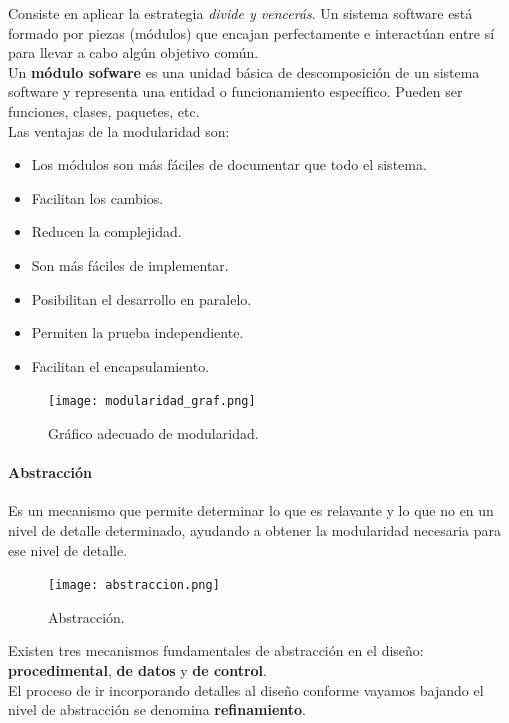 \documentclass[12pt,spanish]{article}
\begin{document}
Consiste en aplicar la estrategia \emph{divide y vencerás}. Un sistema software está formado por piezas (módulos) que encajan perfectamente e interactúan entre sí para llevar a cabo algún objetivo común.\\

Un \textbf{módulo sofware} es una unidad básica de descomposición de un sistema software y representa una entidad o funcionamiento específico. Pueden ser funciones, clases, paquetes, etc.\\

Las ventajas de la modularidad son:

\begin{itemize}
	\item Los módulos son más fáciles de documentar que todo el sistema.
	\item Facilitan los cambios.
	\item Reducen la complejidad.
	\item Son más fáciles de implementar.
	\item Posibilitan el desarrollo en paralelo.
	\item Permiten la prueba independiente.
	\item Facilitan el encapsulamiento.
\end{itemize}

\begin{figure}[H]
\centering
\texttt{[image: modularidad\_graf.png]}
\caption{Gráfico adecuado de modularidad.}
\end{figure}

\paragraph{Abstracción\\}

Es un mecanismo que permite determinar lo que es relavante y lo que no en un nivel de detalle determinado, ayudando a obtener la modularidad necesaria para ese nivel de detalle.

\begin{figure}[H]
\centering
\texttt{[image: abstraccion.png]}
\caption{Abstracción.}
\end{figure}

Existen tres mecanismos fundamentales de abstracción en el diseño: \textbf{procedimental}, \textbf{de datos} y \textbf{de control}. \\

El proceso de ir incorporando detalles al diseño conforme vayamos bajando el nivel de abstracción se denomina \textbf{refinamiento}.
\end{document}

